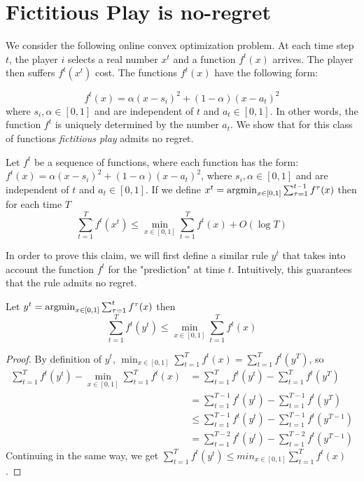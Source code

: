 \section{Fictitious Play is no-regret}\label{s:fictitious_noregret}

We consider the following online convex optimization problem.
At each time step $t$, the player $i$ selects a real number $x^t$ and a
function $f^t(x)$ arrives. The player then suffers $f^t(x^t)$ cost.
The functions $f^t(x)$ have the following form:

$$f^t(x) = \alpha(x-s_i)^2 + (1-\alpha)(x-a_t)^2$$
where $s_i,\alpha \in [0,1]$ and are independent of $t$ and $a_t \in [0,1]$.
In other words, the function $f^t$ is uniquely determined by the number $a_t$.
We show that for this class of functions \emph{fictitious play} admits no regret.
\begin{theorem}\label{t:no_regret}
  Let $f^t$ be a sequence of functions, where each function has the form:
  $f^t(x) = \alpha(x-s_i)^2 + (1-\alpha)(x-a_t)^2$,
  where $s_i,\alpha \in [0,1]$ and are independent of $t$ and $a_t \in [0,1]$.
  If we define \(x^t = \operatorname*{argmin}_{x \in [0,1]} \sum_{\tau = 1}^{t-1} f^\tau (x) \)
  then for each time $T$
  \[
    \sum_{t = 1}^{T} f^t(x^t) \leq
    \min_{x \in [0,1]} \sum_{t=1}^T f^t(x) + O(\log  T)
  \]
\end{theorem}

In order to prove this claim, we will first define a similar rule $y^t$
that takes into account the function $f^t$ for the "prediction" at time $t$.
Intuitively, this guarantees that the rule admits no regret.

\begin{lemma}
  Let
  \(y^t = \operatorname*{argmin}_{x \in [0,1]} \sum_{\tau = 1}^t f^\tau (x)\)
  then
  \[
    \sum_{t=1}^T f^t(y^t) \leq \min_{x \in [0,1]} \sum_{t=1}^T f^t(x)
  \]
\end{lemma}

\begin{proof}By definition of $y^t$,
  $\min_{x \in [0,1]} \sum_{t=1}^T f^t(x) = \sum_{t=1}^T f^t(y^T)$, so
  \begin{align*}
    \sum_{t=1}^T f^t(y^t) - \min_{x \in [0,1]} \sum_{t=1}^T f^t(x) &=
    \sum_{t=1}^T f^t(y^t) - \sum_{t=1}^T f^t(y^T)\\
    &= \sum_{t=1}^{T-1} f^t(y^t) - \sum_{t=1}^{T-1} f^t(y^T)\\
    &\leq \sum_{t=1}^{T-1} f^t(y^t) - \sum_{t=1}^{T-1} f^t(y^{T-1})\\
    &= \sum_{t=1}^{T-2} f^t(y^t) - \sum_{t=1}^{T-2} f^t(y^{T-1})
  \end{align*}
  Continuing in the same way, we get
  $\sum_{t=1}^T f^t(y^t) \leq min_{x \in [0,1]} \sum_{t=1}^T f^t(x)$.
\end{proof}

